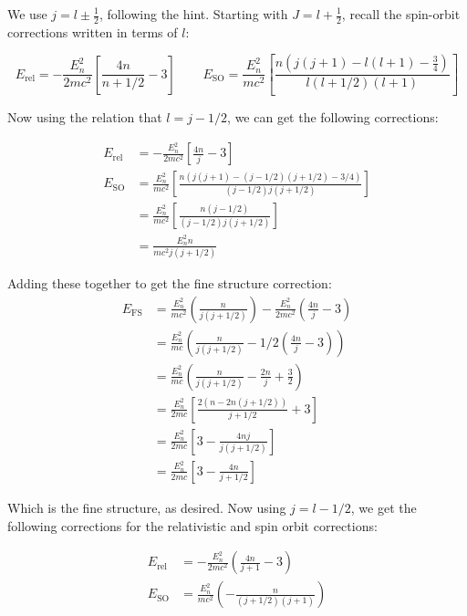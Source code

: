 \documentclass[10pt]{article}
\begin{document}
		\begin{solution}
			We use $j = l \pm \frac 12$, following the hint. Starting with
			$J = l + \frac 12$, recall the spin-orbit corrections written
			in terms of $l$:

			\[ E_{\text{rel}} = -\frac{E_n^2}{2mc^2} 
			\left[\frac{4n}{n+ 1/2} - 3\right] \phantom{aaaa} E_{\text{SO}} = \frac{E_n^2}{mc^2}\left[\frac{n\left(j(j+1) 
			- l(l+1)-\frac34\right)}{l\left(l+1/2\right)(l+1)}\right]\]

			Now using the relation that $l = j - 1/2$, we can get the 
			following corrections:
			
			\begin{align*}
				E_{\text{rel}} &= -\frac{E_n^2}{2mc^2} \left[ \frac{4n}{j} - 3\right]\\
				E_{\text{SO}} &= \frac{E_n^2}{mc^2}\left[ \frac{n(j(j+1) - (j - 1/2)(j + 1/2) - 3/4)}{(j - 1/2)j(j+1/2)}\right]\\
				&= \frac{E_n^2}{mc^2}\left[\frac{n(j - 1/2)}{(j - 1/2)j(j+1/2)}\right]\\
				&= \frac{E_n^2 n}{mc^2j(j + 1/2)}
			\end{align*}

			Adding these together to get the fine structure correction:
			\begin{align*}
				E_{\text{FS}} &= \frac{E_n^2}{mc^2}\left( \frac{n}{j(j + 1/2)}\right) - \frac{E_n^2}{2mc^2}\left( \frac{4n}{j} - 3\right)\\
				&= \frac{E_n^2}{mc}\left( \frac{n}{j(j + 1/2)} - 1/2\left( \frac{4n}{j} - 3\right) \right)\\
				&= \frac{E_n^2}{mc} \left( \frac{n}{j(j+1/2)} - \frac{2n}{j} + \frac 32\right) \\
				&= \frac{E_n^2}{2mc}\left[ \frac{2(n - 2n(j + 1/2))}{j + 1/2} + 3\right]\\
				&= \frac{E_n^2}{2mc}\left[ 3 - \frac{4nj}{j(j + 1/2)}\right]\\
				&= \frac{E_n^2}{2mc}\left[ 3 - \frac{4n}{j + 1/2}\right]
			\end{align*}

			Which is the fine structure, as desired. Now using $j = l - 1/2$, we get the following corrections for the relativistic and 
			spin orbit corrections:

			\begin{align*}
				E_{\text{rel}} &= -\frac{E_n^2}{2mc^2}\left(\frac{4n}{j + 1} - 3\right)\\
				E_{\text{SO}} &= \frac{E_n^2}{mc^2}\left(-\frac{n}{(j + 1/2)(j+1)}\right)
			\end{align*}


\end{solution}
\end{document}
